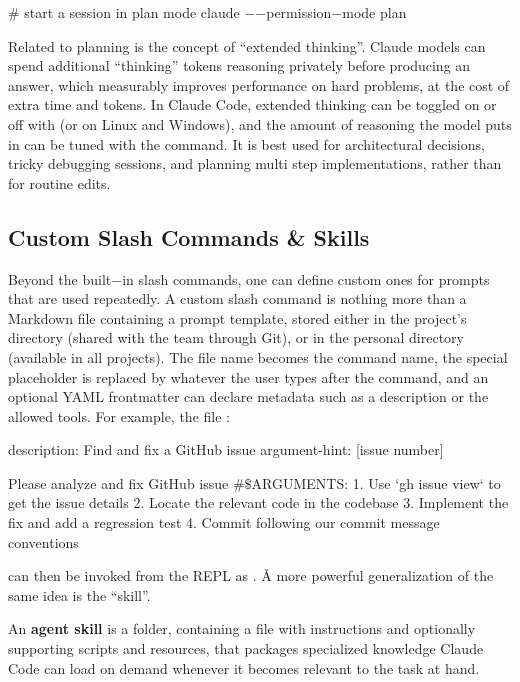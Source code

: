 \begin{bash}
# start a session in plan mode
claude $-$$-$permission$-$mode plan
\end{bash}

Related to planning is the concept of ``extended thinking''. Claude models can spend additional ``thinking'' tokens
reasoning privately before producing an answer, which measurably improves performance on hard problems, at the cost
of extra time and tokens. In Claude Code, extended thinking can be toggled on or off with  (or
 on Linux and Windows), and the amount of reasoning the model puts in can be tuned with the
 command. It is best used for architectural decisions, tricky debugging sessions, and planning
multi step implementations, rather than for routine edits.

\subsection{Custom Slash Commands \& Skills}

Beyond the built$-$in slash commands, one can define custom ones for prompts that are used repeatedly. A custom slash
command is nothing more than a Markdown file containing a prompt template, stored either in the project's
 directory (shared with the team through Git), or in the personal 
directory (available in all projects). The file name becomes the command name, the special placeholder
 is replaced by whatever the user types after the command, and an optional YAML frontmatter can
declare metadata such as a description or the allowed tools. For example, the file
:

\begin{block}
description: Find and fix a GitHub issue
argument-hint: [issue number]

Please analyze and fix GitHub issue #$\$$ARGUMENTS:
1. Use `gh issue view` to get the issue details
2. Locate the relevant code in the codebase
3. Implement the fix and add a regression test
4. Commit following our commit message conventions
\end{block}

can then be invoked from the REPL as . \v

A more powerful generalization of the same idea is the ``skill''.

An \textbf{agent skill} is a folder, containing a  file with instructions and optionally supporting
scripts and resources, that packages specialized knowledge Claude Code can load on demand whenever it becomes
relevant to the task at hand.
\ed

